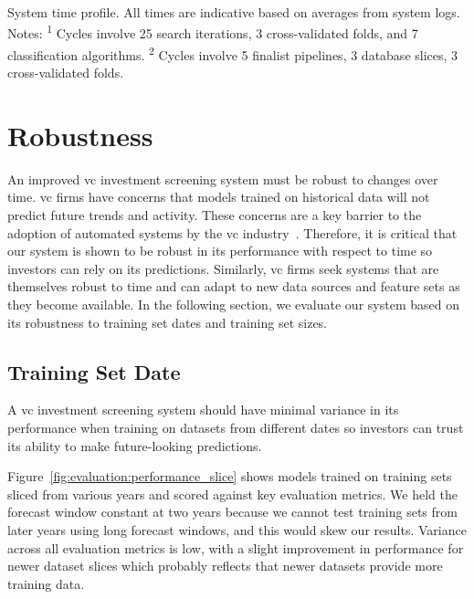 \documentclass[../thesis/thesis.tex]{subfiles}
\begin{document}
\begin{table}[!htb]
    \centering
    \scalebox{0.9}{}
    \caption[System time profile]{System time profile.  All times are indicative based on averages from system logs. Notes: \textsuperscript{1} Cycles involve 25 search iterations, 3 cross-validated folds, and 7 classification algorithms. \textsuperscript{2} Cycles involve 5 finalist pipelines, 3 database slices, 3 cross-validated folds.}
    \label{tab:evaluation:time_profile}
\end{table}

\section{Robustness}

An improved \gls{vc} investment screening system must be robust to changes over time. \Gls{vc} firms have concerns that models trained on historical data will not predict future trends and activity. These concerns are a key barrier to the adoption of automated systems by the \gls{vc} industry~\cite{stone2014}. Therefore, it is critical that our system is shown to be robust in its performance with respect to time so investors can rely on its predictions. Similarly, \gls{vc} firms seek systems that are themselves robust to time and can adapt to new data sources and feature sets as they become available. In the following section, we evaluate our system based on its robustness to training set dates and training set sizes.

\subsection{Training Set Date}

A \gls{vc} investment screening system should have minimal variance in its performance when training on datasets from different dates so investors can trust its ability to make future-looking predictions.

Figure~\ref{fig:evaluation:performance_slice} shows models trained on training sets sliced from various years and scored against key evaluation metrics. We held the forecast window constant at two years because we cannot test training sets from later years using long forecast windows, and this would skew our results. Variance across all evaluation metrics is low, with a slight improvement in performance for newer dataset slices which probably reflects that newer datasets provide more training data.
\end{document}
